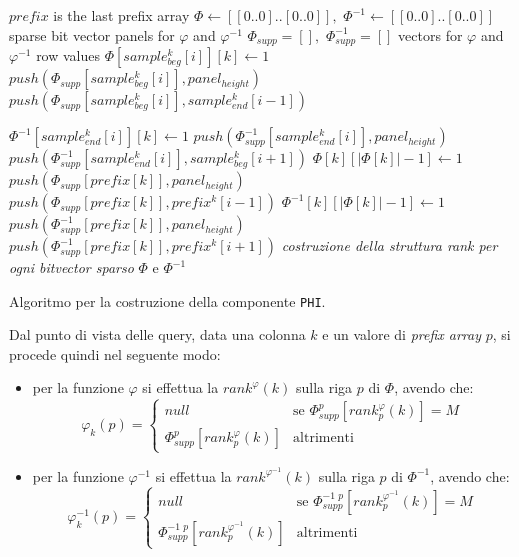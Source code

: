 \begin{algorithm}
  \footnotesize
  \begin{algorithmic}[1]
    \Comment  $prefix$ is the last prefix array
    \State $\varPhi\gets [[0..0]..[0..0]],\,\,\varPhi^{-1}\gets
    [[0..0]..[0..0]]$ 
    \Comment sparse bit vector panels for $\varphi$ and $\varphi^{-1}$
    \State $\varPhi_{supp} = [],\,\,\varPhi_{supp}^{-1} = []$
    \Comment vectors for $\varphi$ and $\varphi^{-1}$ row values
    \For {\textit{every} $k\in [0,|cols|)$}
    \For {\textit{every} $i\in [0,|samples_{beg}|)$}
    \State $\varPhi[sample_{beg}^{k}[i]][k]\gets 1$
    \State $push(\varPhi_{supp}[sample_{beg}^{k}[i]], panel_{height})$
    \Else
    \State $push(\varPhi_{supp}[sample_{beg}^{k}[i]],sample_{end}^{k}[i-1])$
    \EndIf

    \State $\varPhi^{-1}[sample_{end}^{k}[i]][k]\gets 1$
    \State $push(\varPhi_{supp}^{-1}[sample_{end}^{k}[i]], panel_{height})$
    \Else
    \State $push(\varPhi_{supp}^{-1}[sample_{end}^{k}[i]],sample_{beg}^{k}[i+1])$
    \EndIf
    \EndFor
    \EndFor
    \For {\textit{every} $k\in [0,|prefix|)$}
    \State $\varPhi[k][|\varPhi[k]|-1]\gets 1$
    \State $push(\varPhi_{supp}[prefix[k]], panel_{height})$
    \Else
    \State $push(\varPhi_{supp}[prefix[k]] ,prefix^k[i-1])$
    \EndIf
    \EndIf
    \State $\varPhi^{-1}[k][|\varPhi[k]|-1]\gets 1$
    \State $push(\varPhi^{-1}_{supp}[prefix[k]], panel_{height})$
    \Else
    \State $push(\varPhi^{-1}_{supp}[prefix[k]],prefix^k[i+1])$
    \EndIf
    \EndIf
    \EndFor
    \State \textit{costruzione della struttura rank per ogni bitvector sparso}
    $\varPhi$ e $\varPhi^{-1}$
    \EndFunction
  \end{algorithmic}
  \caption{Algoritmo per la costruzione della componente \texttt{PHI}.}
  \label{algo:phicos}
\end{algorithm}
Dal punto di vista delle query, data una colonna $k$ e un valore di
\textit{prefix array} $p$, si procede quindi nel seguente modo:
\begin{itemize}
  \item per la funzione $\varphi$ si effettua la $rank^\varphi(k)$ sulla riga
  $p$ di $\varPhi$, avendo che:
  \[\varphi_k(p)=
    \begin{cases}
      null&\mbox{se }\varPhi_{supp}^p[rank^\varphi_p(k)]=M\\
      \varPhi_{supp}^p[rank^\varphi_p(k)]&\mbox{altrimenti }
    \end{cases}
  \]
  \item per la funzione $\varphi^{-1}$ si effettua la $rank^{\varphi^{-1}}(k)$
  sulla riga $p$ di $\varPhi^{-1}$, avendo che:
  \[\varphi_k^{-1}(p)=
    \begin{cases}
      null&\mbox{se }\varPhi^{-1\,\,p}_{supp}[rank^{\varphi^{-1}}_p(k)]=M\\
      \varPhi^{-1\,\,p}_{supp}[rank^{\varphi^{-1}}_p(k)]&\mbox{altrimenti }
    \end{cases}
  \]
\end{itemize}
